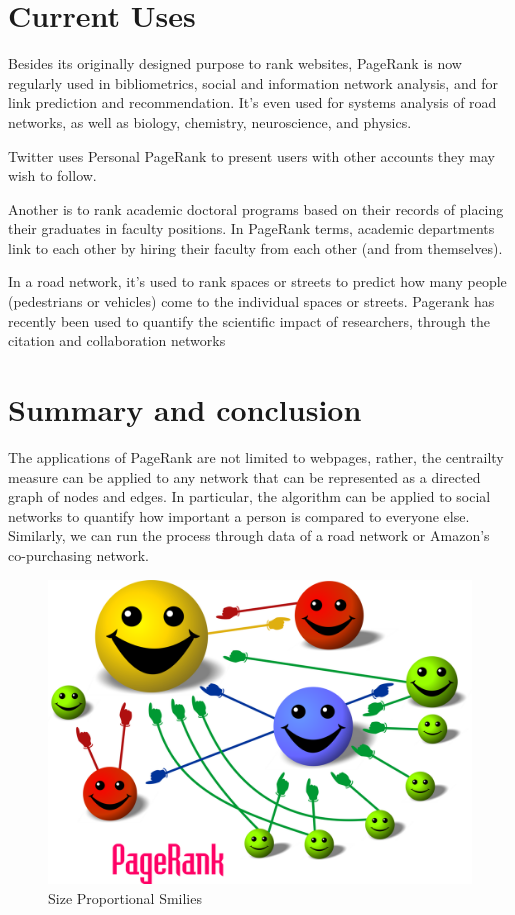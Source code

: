\documentclass[10pt]{siamltex}
\begin{document}
\section{Current Uses}
\label{sec:uses_and_history}
Besides its originally designed purpose to rank websites, PageRank is now regularly used in bibliometrics, social and information network analysis, and for link prediction and recommendation. It's even used for systems analysis of road networks, as well as biology, chemistry, neuroscience, and physics. 

Twitter uses Personal PageRank to present users with other accounts they may wish to follow.

Another is to rank academic doctoral programs based on their records of placing their graduates in faculty positions. In PageRank terms, academic departments link to each other by hiring their faculty from each other (and from themselves).

In a road network, it's used to rank spaces or streets to predict how many people (pedestrians or vehicles) come to the individual spaces or streets.  Pagerank has recently been used to quantify the scientific impact of researchers, through the citation and collaboration networks \cite{wiki:PageRank}

\section{Summary and conclusion}  \label{sec:conclusion}
The applications of PageRank are not limited to webpages, rather, the centrailty measure can be applied to any network that can be represented as a directed graph of nodes and edges.  In particular, the algorithm can be applied to social networks to quantify how important a person is compared to everyone else.  Similarly, we can run the process through data of a road network or Amazon's co-purchasing network.

\begin{figure}[ht]
\begin{center}
\includegraphics[width=0.4\columnwidth]{PageRank-hi-res}
\end{center}
\caption{Size Proportional Smilies\cite{wiki:PageRank} }
\label{fig:PageRank-hi-res}
\end{figure}

\newpage



\end{document}
